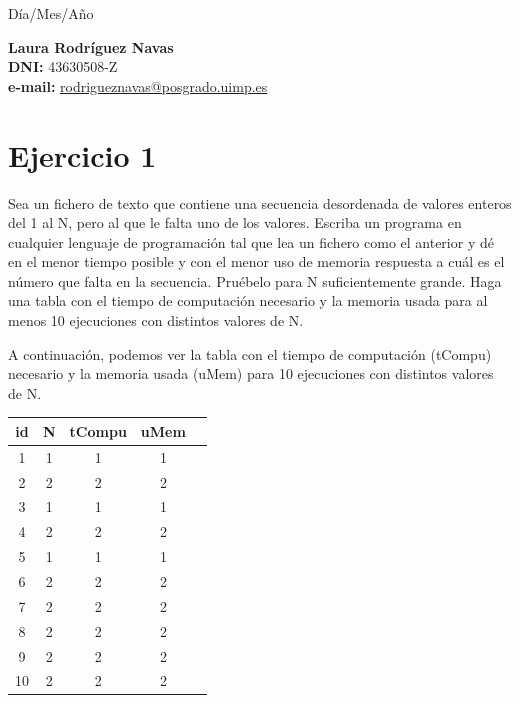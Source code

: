 \documentclass{uimppracticas}
\begin{document}
	
\frontmatter


\begin{center}
	\large Día/Mes/Año
\end{center}

\vspace{30mm}

\begin{flushright}
	{\bf Laura Rodríguez Navas}\\
	\textbf{DNI:} 43630508-Z\\
	\textbf{e-mail:} \href{rodrigueznavas@posgrado.uimp.es}{rodrigueznavas@posgrado.uimp.es}
\end{flushright}

\newpage

\tableofcontents

\newpage

\mainmatter

\section{Ejercicio 1}

Sea un fichero de texto que contiene una secuencia desordenada de valores enteros del 1 al N, pero al que le falta uno de los valores. Escriba un programa en cualquier lenguaje de programación tal que lea un fichero como el anterior y dé en el menor tiempo posible y con el menor uso de memoria respuesta a cuál es el número que falta en la secuencia. Pruébelo para N suficientemente grande. Haga una tabla con el tiempo de computación necesario y la memoria usada para al menos 10 ejecuciones con distintos valores de N.

%

A continuación, podemos ver la tabla con el tiempo de computación (tCompu) necesario y la memoria usada (uMem) para 10 ejecuciones con distintos valores de N.

\begin{center}
	\begin{tabular}{ |c|c|c|c|c| } 
		\hline
		id & N & tCompu & uMem \\
		\hline
		1 & 1 & 1 & 1 \\ 
		2 & 2 & 2 & 2 \\ 
		3 & 1 & 1 & 1 \\ 
		4 & 2 & 2 & 2 \\ 
		5 & 1 & 1 & 1 \\ 
		6 & 2 & 2 & 2 \\ 
		7 & 2 & 2 & 2 \\ 
		8 & 2 & 2 & 2 \\ 
		9 & 2 & 2 & 2 \\ 
		10 & 2 & 2 & 2 \\ 
		\hline
	\end{tabular}
\end{center}
\end{document}
